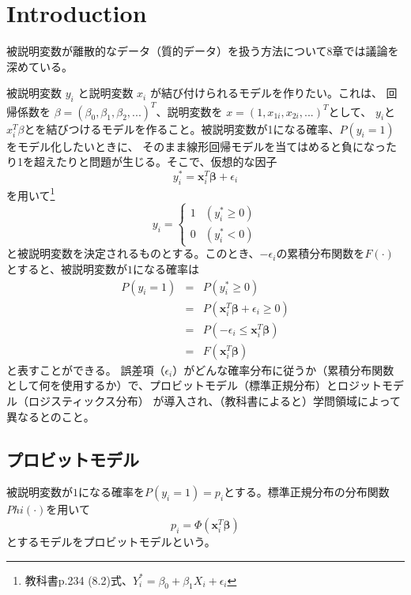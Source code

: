 \documentclass[10pt, a4paper]{ltjsarticle}
\begin{document}
\section{Introduction}

被説明変数が離散的なデータ（質的データ）を扱う方法について8章では議論を深めている。

被説明変数 $y_i$ と説明変数 $x_i$ が結び付けられるモデルを作りたい。これは、
回帰係数を $\beta=(\beta_0,\beta_1,\beta_2,...)^T$、説明変数を $x=(1,x_{1i},x_{2i},...)^T$として、
$y_i$と$x_i^T\beta$とを結びつけるモデルを作ること。被説明変数が1になる確率、$P(y_i=1)$をモデル化したいときに、
そのまま線形回帰モデルを当てはめると負になったり1を超えたりと問題が生じる。そこで、仮想的な因子
\begin{equation}
  y_i^\ast = \bm{x}_i^T\bm{\beta} + \epsilon_i
\end{equation}
を用いて\footnote{教科書p.234 (8.2)式、$Y_i^\ast=\beta_0+\beta_1X_i+\epsilon_i$}
\begin{equation}
y_i = \begin{cases}
1 & (y_i^\ast \geq 0 ) \\
0 & (y_i^\ast < 0 )
\end{cases}
\end{equation}
と被説明変数を決定されるものとする。このとき、$-\epsilon_i$の累積分布関数を$F(\cdot)$とすると、被説明変数が$1$になる確率は
\begin{eqnarray}
  P(y_i=1)&=&P(y_i^\ast \geq 0) \\
  &=&P(\bm{x}_i^T\bm{\beta} + \epsilon_i \geq 0) \\
  &=&P(-\epsilon_i \leq \bm{x}_i^T\bm{\beta}) \\
  &=&F(\bm{x}_i^T\bm{\beta}) \label{eq:prob}
\end{eqnarray}
と表すことができる。
誤差項（$\epsilon_i$）がどんな確率分布に従うか（累積分布関数として何を使用するか）で、プロビットモデル（標準正規分布）とロジットモデル（ロジスティックス分布）
が導入され、（教科書によると）学問領域によって異なるとのこと。

\subsection{プロビットモデル}

被説明変数が$1$になる確率を$P(y_i=1)=p_i$とする。標準正規分布の分布関数$Phi(\cdot)$を用いて
\begin{equation}
  p_i = \Phi(\bm{x}_i^T\bm{\beta})
\end{equation}
とするモデルをプロビットモデルという。
\end{document}
